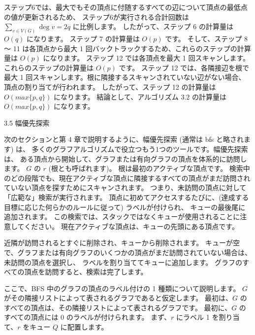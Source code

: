 
ステップ6では、最大でもその頂点に付随するすべての辺について頂点の最低点の値が更新されるため、
ステップ6が実行される合計回数は $\sum _{v\in V(G)} \deg v = 2q$ に比例します。
したがって、ステップ 6 の計算量は $O(q)$ になります。 ステップ 7 の計算量は $O(p)$ です。
そして、ステップ 8 ～ 11 は各頂点から最大 1 回バックトラックするため、これらのステップの計算量は $O(p)$ になります。 
ステップ 12 では各頂点を最大 1 回スキャンします。これらのステップの計算量は $O(p)$ です。
ステップ 12 では、各隣接辺を根で最大 1 回スキャンします。根に隣接するスキャンされていない辺がない場合、頂点の割り当てが行われます。 
したがって、ステップ 12 の計算量は $O(max \{p, q\})$ になります。 
結論として、アルゴリズム 3.2 の計算量は $O(max \{p, q\})$ になります。

3.5 幅優先探索

次のセクションと第 4 章で説明するように、幅優先探索 (通常は bfs と略されます) は、
多くのグラフアルゴリズムで役立つもう1つのツールです。幅優先探索は、
ある頂点から開始して、グラフまたは有向グラフの頂点を体系的に訪問します。
$G$ の $r$ (根とも呼ばれます)。 根は最初のアクティブな頂点です。
検索中のどの段階でも、現在アクティブな頂点に隣接するすべての頂点がまだ訪問されていない頂点を探すためにスキャンされます。
つまり、未訪問の頂点に対して「広範な」検索が実行されます。 
頂点に初めてアクセスするたびに、(達成する目標に応じた何らかのルールに従って) ラベルが付けられ、
キューの最後尾に追加されます。 この検索では、スタックではなくキューが使用されることに注意してください。
現在アクティブな頂点は、キューの先頭にある頂点です。 

近隣が訪問されるとすぐに削除され、キューから削除されます。 
キューが空で、グラフまたは有向グラフのいくつかの頂点がまだ訪問されていない場合は、未訪問の頂点を選択し、
ラベルを割り当ててキューに追加します。 グラフのすべての頂点を訪問すると、検索は完了します。

ここで、BFS 中のグラフの頂点のラベル付けの 1 種類について説明します。
$G$ がその隣接リストによって表されるグラフであると仮定します。
最初は、$G$ のすべての頂点は、その隣接リストによって表されるグラフです。 最初に、$G$ のすべての頂点には 0 のラベルが付けられます。
まず、$r$ にラベル 1 を割り当て、$r$ をキュー $Q$ に配置します。